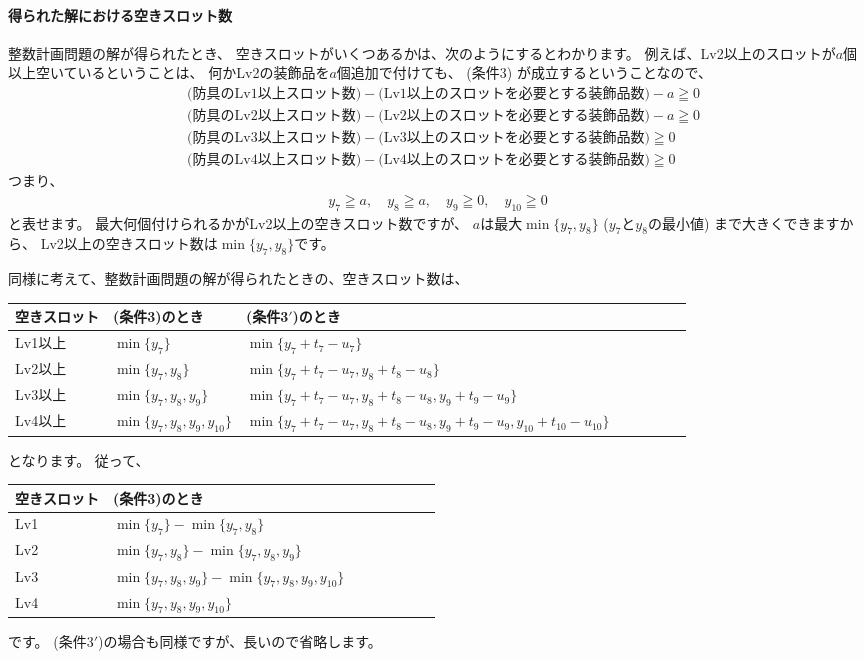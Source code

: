\documentclass{jsarticle}
\begin{document}
\paragraph{得られた解における空きスロット数}
整数計画問題の解が得られたとき、
空きスロットがいくつあるかは、次のようにするとわかります。
例えば、Lv2以上のスロットが$a$個以上空いているということは、
何かLv2の装飾品を$a$個追加で付けても、
(条件3) が成立するということなので、
\begin{align*}
&\text{(防具のLv1以上スロット数)}-
\text{(Lv1以上のスロットを必要とする装飾品数)} -a \geqq 0 \\
&\text{(防具のLv2以上スロット数)}-
\text{(Lv2以上のスロットを必要とする装飾品数)} -a \geqq 0 \\
&\text{(防具のLv3以上スロット数)}-
\text{(Lv3以上のスロットを必要とする装飾品数)} \geqq 0 \\
&\text{(防具のLv4以上スロット数)}-
\text{(Lv4以上のスロットを必要とする装飾品数)} \geqq 0 
\end{align*}
つまり、
\begin{align*}
y_7 \geqq a, \quad
y_8 \geqq a, \quad
y_9 \geqq 0, \quad
y_{10} \geqq 0
\end{align*}
と表せます。
最大何個付けられるかがLv2以上の空きスロット数ですが、
$a$は最大$\min\{y_7, y_8\}$ ($y_7$と$y_8$の最小値) まで大きくできますから、
Lv2以上の空きスロット数は$\min\{y_7, y_8\}$です。

同様に考えて、整数計画問題の解が得られたときの、空きスロット数は、
\begin{center}
\begin{tabular}{llllllll}
\toprule
空きスロット & (条件3)のとき & (条件3$'$)のとき \\
\midrule
Lv1以上 & $\min\{y_7\}$
& $\min\{y_7+t_7-u_7\}$ \\
Lv2以上 & $\min\{y_7,y_8\}$ 
& $\min\{y_7+t_7-u_7,y_8+t_8-u_8\}$ \\
Lv3以上 & $\min\{y_7,y_8,y_9\}$ 
& $\min\{y_7+t_7-u_7,y_8+t_8-u_8,y_9+t_9-u_9\}$ \\
Lv4以上 & $\min\{y_7,y_8,y_9,y_{10}\}$
& $\min\{y_7+t_7-u_7,y_8+t_8-u_8,y_9+t_9-u_9,y_{10}+t_{10}-u_{10}\}$
 \\
\bottomrule
\end{tabular}
\end{center}
となります。
従って、
\begin{center}
\begin{tabular}{llllllll}
\toprule
空きスロット & (条件3)のとき \\
\midrule
Lv1 & $\min\{y_7\} - \min\{y_7,y_8\}$ \\
Lv2 & $\min\{y_7,y_8\} -\min\{y_7,y_8,y_9\}$  \\
Lv3 & $\min\{y_7,y_8,y_9\} - \min\{y_7,y_8,y_9,y_{10}\}$ \\
Lv4 & $\min\{y_7,y_8,y_9,y_{10}\}$
\\
\bottomrule
\end{tabular}
\end{center}
です。
(条件3$'$)の場合も同様ですが、長いので省略します。
\end{document}
